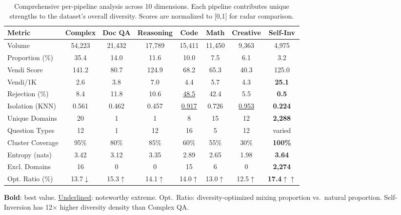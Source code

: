 \begin{table}[t]
\centering
\caption{Comprehensive per-pipeline analysis across 10 dimensions. Each pipeline contributes unique strengths to the dataset's overall diversity. Scores are normalized to [0,1] for radar comparison.}
\label{tab:master_pipeline}
\small
\setlength{\tabcolsep}{4pt}
\begin{tabular}{lccccccc}
\toprule
\textbf{Metric} & \textbf{Complex} & \textbf{Doc QA} & \textbf{Reasoning} & \textbf{Code} & \textbf{Math} & \textbf{Creative} & \textbf{Self-Inv} \\
\midrule
Volume & 54,223 & 21,432 & 17,789 & 15,411 & 11,450 & 9,363 & 4,975 \\
Proportion (\%) & 35.4 & 14.0 & 11.6 & 10.0 & 7.5 & 6.1 & 3.2 \\
Vendi Score & 141.2 & 80.7 & 124.9 & 68.2 & 65.3 & 40.3 & 125.0 \\
Vendi/1K & 2.6 & 3.8 & 7.0 & 4.4 & 5.7 & 4.3 & \textbf{25.1} \\
Rejection (\%) & 8.4 & 11.8 & 10.6 & \underline{48.5} & 42.4 & 5.5 & \textbf{0.5} \\
Isolation (KNN) & 0.561 & 0.462 & 0.457 & \underline{0.917} & 0.726 & \underline{0.953} & \textbf{0.224} \\
Unique Domains & 20 & 1 & 1 & 8 & 15 & 12 & \textbf{2,288} \\
Question Types & 12 & 1 & 12 & 16 & 5 & 12 & varied \\
Cluster Coverage & 95\% & 80\% & 85\% & 60\% & 55\% & 30\% & \textbf{100\%} \\
Entropy (nats) & 3.42 & 3.12 & 3.35 & 2.89 & 2.65 & 1.98 & \textbf{3.64} \\
Excl. Domains & 16 & 0 & 0 & 15 & 6 & 0 & \textbf{2,274} \\
\midrule
Opt. Ratio (\%) & 13.7$\downarrow$ & 15.3$\uparrow$ & 14.1$\uparrow$ & 14.0$\uparrow$ & 13.0$\uparrow$ & 12.5$\uparrow$ & \textbf{17.4$\uparrow\uparrow$} \\
\bottomrule
\end{tabular}
\vspace{-0.5em}
\begin{flushleft}
\scriptsize \textbf{Bold}: best value. \underline{Underlined}: noteworthy extreme. Opt.\ Ratio: diversity-optimized mixing proportion vs.\ natural proportion. Self-Inversion has 12$\times$ higher diversity density than Complex QA.
\end{flushleft}
\end{table}